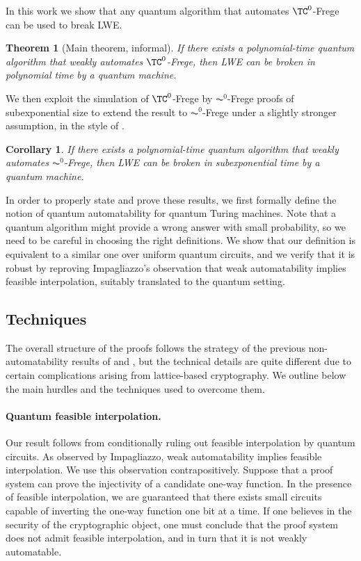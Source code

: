 \documentclass[11pt]{article}
\theoremstyle{definition}
\theoremstyle{plain}
\newtheorem*{theorem*}{Theorem}
\newtheorem*{corollary*}{Corollary}
\theoremstyle{remark}
\begin{document}
In this work we show that any quantum algorithm that automates $\TC^0$-Frege can be used to break LWE.

\begin{theorem*}[Main theorem, informal]
    If there exists a polynomial-time quantum algorithm that weakly automates $\TC^0$-Frege, then LWE can be broken in polynomial time by a quantum machine.
\end{theorem*}

We then exploit the simulation of $\TC^0$-Frege by $\AC^0$-Frege proofs of subexponential size to extend the result to $\AC^0$-Frege under a slightly stronger assumption, in the style of \citeauthor{BDGMP04} \cite{BDGMP04}.

\begin{corollary*}
    If there exists a polynomial-time quantum algorithm that weakly automates $\AC^0$-Frege, then LWE can be broken in subexponential time by a quantum machine.
\end{corollary*}

In order to properly state and prove these results, we first formally define the notion of quantum automatability for quantum Turing machines. Note that a quantum algorithm might provide a wrong answer with small probability, so we need to be careful in choosing the right definitions. We show that our definition is equivalent to a similar one over uniform quantum circuits, and we verify that it is robust by reproving Impagliazzo's observation that weak automatability implies feasible interpolation, suitably translated to the quantum setting.

\subsection*{Techniques}
The overall structure of the proofs follows the strategy of the previous non-automatability results of \citeauthor{KP98} \cite{KP98} and \citeauthor{BPR1997} \cite{BPR1997}, but the technical details are quite different due to certain complications arising from lattice-based cryptography. We outline below the main hurdles and the techniques used to overcome them.

\paragraph{Quantum feasible interpolation.}
Our result follows from conditionally ruling out feasible interpolation by quantum circuits. As observed by Impagliazzo, weak automatability implies feasible interpolation. We use this observation contrapositively. Suppose that a proof system can prove the injectivity of a candidate one-way function. In the presence of feasible interpolation, we are guaranteed that there exists small circuits capable of inverting the one-way function one bit at a time. If one believes in the security of the cryptographic object, one must conclude that the proof system does not admit feasible interpolation, and in turn that it is not weakly automatable.
\end{document}
